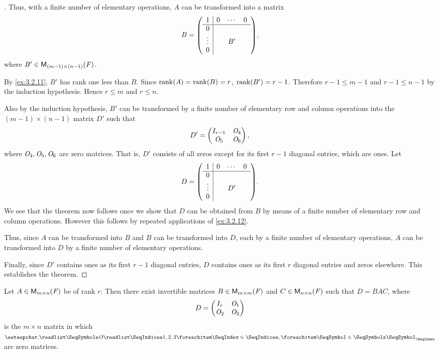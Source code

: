 \begin{proof}[]
	Thus, with a finite number of elementary operations, \(A\) can be transformed into a matrix
	\[
		B = \pa{\begin{array}{c|ccc}
				1      & 0 & \cdots & 0 \\
				\hline
				0      &   &        &   \\
				\vdots &   & B'     &   \\
				0      &   &        &
			\end{array}},
	\]
	where \(B' \in \ms[(m - 1)][(n - 1)][\F]\).

	By \cref{ex:3.2.11}, \(B'\) has rank one less than \(B\).
	Since \(\rk{A} = \rk{B} = r\), \(\rk{B'} = r - 1\).
	Therefore \(r - 1 \leq m - 1\) and \(r - 1 \leq n - 1\) by the induction hypothesis.
	Hence \(r \leq m\) and \(r \leq n\).

	Also by the induction hypothesis, \(B'\) can be transformed by a finite number of elementary row and column operations into the \((m-1) \times (n-1)\) matrix \(D'\) such that
	\[
		D' = \begin{pmatrix}
			I_{r - 1} & \mathit{O}_4 \\
			\mathit{O}_5     & \mathit{O}_6
		\end{pmatrix},
	\]
	where \(\mathit{O}_4, \mathit{O}_5, \mathit{O}_6\) are zero matrices.
	That is, \(D'\) consists of all zeros except for its first \(r - 1\) diagonal entries, which are ones.
	Let
	\[
		D = \pa{\begin{array}{c|ccc}
				1      & 0 & \cdots & 0 \\
				\hline
				0      &   &        &   \\
				\vdots &   & D'     &   \\
				0      &   &        &
			\end{array}}.
	\]
	We see that the theorem now follows once we show that \(D\) can be obtained from \(B\) by means of a finite number of elementary row and column operations.
	However this follows by repeated applications of \cref{ex:3.2.12}.

	Thus, since \(A\) can be transformed into \(B\) and \(B\) can be transformed into \(D\), each by a finite number of elementary operations, \(A\) can be transformed into \(D\) by a finite number of elementary operations.

	Finally, since \(D'\) contains ones as its first \(r - 1\) diagonal entries, \(D\) contains ones as its first \(r\) diagonal entries and zeros elsewhere.
	This establishes the theorem.
\end{proof}

\begin{cor}\label{3.2.4}
	Let \(A \in \ms\) be of rank \(r\).
	Then there exist invertible matrices \(B \in \ms[m][m][\F]\) and \(C \in \ms[n][n][\F]\) such that \(D = BAC\), where
	\[
		D = \begin{pmatrix}
			I_r   & \mathit{O}_1 \\
			\mathit{O}_2 & \mathit{O}_3
		\end{pmatrix}
	\]
	is the \(m \times n\) matrix in which \(\seq{\zm}{1,2,3}\) are zero matrices.
\end{cor}

